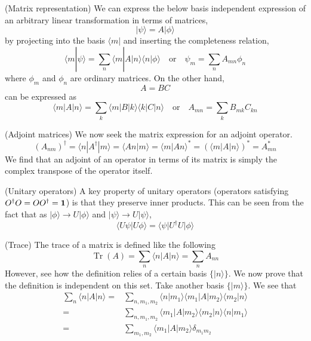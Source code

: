 \begin{rmk}
\begin{prop}
(Matrix representation) We can express the below basis independent expression of an arbitrary linear transformation in terms of matrices,
\[|\psi \rangle =A|\phi \rangle \]
by projecting into the basis $\langle m|$ and inserting the completeness relation,
\[\langle m|\psi \rangle =\sum _{n}\langle m|A|n\rangle \langle n|\phi \rangle \quad \mathrm{or}\quad \psi _{m}=\sum_{n}A_{mn}\phi _{n}\]
where $\phi _{m}$ and $\phi _{n}$ are ordinary matrices. On the other hand,
\[A=BC\]
can be expressed as
\[\langle m|A|n\rangle =\sum _{k}\langle m|B|k\rangle \langle k|C|n\rangle \quad \mathrm{or}\quad A_{mn}=\sum _{k}B_{mk}C_{kn}\]
\end{prop}
\vspace{2ex}
\begin{rmk}
(Adjoint matrices) We now seek the matrix expression for an adjoint operator.
\[(A_{nm})^{\dagger}=\langle n|A^{\dagger}|m\rangle =\langle An|m\rangle =\langle m|An\rangle ^{*}=(\langle m|A|n\rangle )^{*}=A^{*}_{mn}\]
We find that an adjoint of an operator in terms of its matrix is simply the complex transpose of the operator itself.
\end{rmk}
\vspace{2ex}
\begin{defi}
(Unitary operators) A key property of unitary operators (operators satisfying $O^{\dagger}O=OO^{\dagger}={\bf 1}$) is that they preserve inner products. This can be seen from the fact that as $|\phi \rangle \rightarrow U|\phi \rangle $ and $|\psi \rangle \rightarrow U|\psi \rangle $, 
\[\langle U\psi |U\phi \rangle =\langle \psi |U^{\dagger}U|\phi \rangle \]
\end{defi}
\vspace{2ex}
\begin{defi}
(Trace) The trace of a matrix is defined like the following
\[\mathop{\mathrm{Tr}}(A)=\sum _{n}\langle n|A|n\rangle =\sum _{n}A_{nn}\]
However, see how the definition relies of a certain basis $\{|n\rangle \}$. We now prove that the definition is independent on this set. Take another basis $\{|m\rangle \}$. We see that
\begin{align*}
\sum _{n}\langle n|A|n\rangle =&\sum _{n,m_1,m_2}\langle n|m_1\rangle \langle m_1|A|m_2\rangle \langle m_2|n\rangle \\=&\sum _{n,m_1,m_2}\langle m_1|A|m_2\rangle \langle m_2|n\rangle \langle n|m_1\rangle\\ =&\sum _{m_1,m_2}\langle m_1|A|m_2\rangle \delta _{m_1m_2}

\end{align*}
\end{defi}
\end{rmk}
